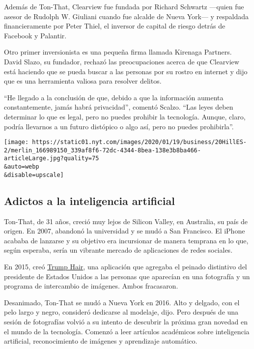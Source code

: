 Además de Ton-That, Clearview fue fundada por Richard Schwartz ---quien
fue asesor de Rudolph W. Giuliani cuando fue alcalde de Nueva York--- y
respaldada financieramente por Peter Thiel, el inversor de capital de
riesgo detrás de Facebook y Palantir.

Otro primer inversionista es una pequeña firma llamada Kirenaga
Partners. David Slazo, su fundador, rechazó las preocupaciones acerca de
que Clearview está haciendo que se pueda buscar a las personas por su
rostro en internet y dijo que es una herramienta valiosa para resolver
delitos.

``He llegado a la conclusión de que, debido a que la información aumenta
constantemente, jamás habrá privacidad'', comentó Scalzo. ``Las leyes
deben determinar lo que es legal, pero no puedes prohibir la tecnología.
Aunque, claro, podría llevarnos a un futuro distópico o algo así, pero
no puedes prohibirla''.

\texttt{[image: https://static01.nyt.com/images/2020/01/19/business/20HillES-2/merlin\_166989150\_339af8f6-72dc-4344-8bea-138e3b8ba466-articleLarge.jpg?quality=75\\\&auto=webp\\\&disable=upscale]}

\hypertarget{adictos-a-la-inteligencia-artificial}{%
\subsection{Adictos a la inteligencia
artificial}\label{adictos-a-la-inteligencia-artificial}}

Ton-That, de 31 años, creció muy lejos de Silicon Valley, en Australia,
su país de origen. En 2007, abandonó la universidad y se mudó a San
Francisco. El iPhone acababa de lanzarse y su objetivo era incursionar
de manera temprana en lo que, según esperaba, sería un vibrante mercado
de aplicaciones de redes sociales.

En 2015, creó \href{https://www.148apps.com/app/1040750174/}{Trump
Hair}, una aplicación que agregaba el peinado distintivo del presidente
de Estados Unidos a las personas que aparecían en una fotografía y un
programa de intercambio de imágenes. Ambos fracasaron.

Desanimado, Ton-That se mudó a Nueva York en 2016. Alto y delgado, con
el pelo largo y negro, consideró dedicarse al modelaje, dijo. Pero
después de una sesión de fotografías volvió a su intento de descubrir la
próxima gran novedad en el mundo de la tecnología. Comenzó a leer
artículos académicos sobre inteligencia artificial, reconocimiento de
imágenes y aprendizaje automático.

